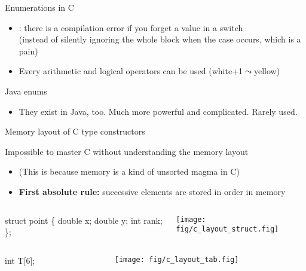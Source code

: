 \begin{Coupe}
\begin{frame}[fragile]{Enumerations in C}
    \begin{itemize}
    \item {}: there is a compilation error if you forget a value in a switch\\
      {\small(instead of silently ignoring the whole block when the case
        occurs, which is a pain)}
    \item Every arithmetic and logical operators can be used (white+1$\leadsto$yellow)
    \end{itemize}
  \begin{block}{Java enums}
    \begin{itemize}
    \item They exist in Java, too. Much more powerful and complicated. Rarely used.
    \end{itemize}
  \end{block}
\end{frame}
\begin{frame}[fragile]{Memory layout of C type constructors}
  \begin{block}{Impossible to master C without understanding the memory layout}
    \begin{itemize}
    \item (This is because memory is a kind of unsorted magma in C)
    \item \alert{\textbf{First absolute rule:}} successive elements are stored in order in memory
    \end{itemize}
    \begin{columns}
      \begin{column}{.3\linewidth}
        \begin{boitecode}{}
struct point \{
  double x;
  double y;
  int rank;    \};                  
        \end{boitecode}
      \end{column}
      \begin{column}{.6\linewidth}
        \texttt{[image: fig/c\_layout\_struct.fig]}
      \end{column}
    \end{columns}

    \begin{columns}
      \begin{column}{.3\linewidth}
        \begin{boitecode}{}
int T[6]; 
        \end{boitecode}
      \end{column}
      \begin{column}[t]{.6\linewidth}
        \texttt{[image: fig/c\_layout\_tab.fig]}
      \end{column}
    \end{columns}
    

\end{block}
\end{frame}
\end{Coupe}

